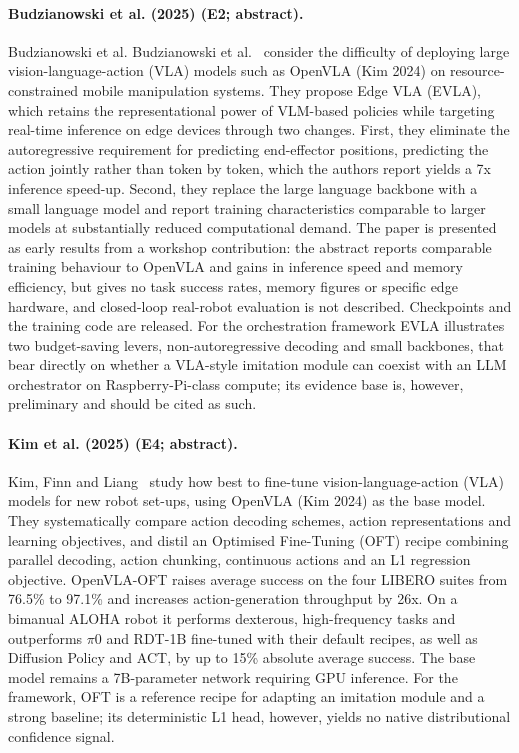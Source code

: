 \documentclass[10pt,a4paper]{article}
\begin{document}
\paragraph{Budzianowski et al. (2025) (E2; abstract).} Budzianowski et al. Budzianowski et al.~\cite{Budzianowski2025} consider the difficulty of deploying large vision-language-action (VLA) models such as OpenVLA (Kim 2024) on resource-constrained mobile manipulation systems. They propose Edge VLA (EVLA), which retains the representational power of VLM-based policies while targeting real-time inference on edge devices through two changes. First, they eliminate the autoregressive requirement for predicting end-effector positions, predicting the action jointly rather than token by token, which the authors report yields a 7x inference speed-up. Second, they replace the large language backbone with a small language model and report training characteristics comparable to larger models at substantially reduced computational demand. The paper is presented as early results from a workshop contribution: the abstract reports comparable training behaviour to OpenVLA and gains in inference speed and memory efficiency, but gives no task success rates, memory figures or specific edge hardware, and closed-loop real-robot evaluation is not described. Checkpoints and the training code are released. For the orchestration framework EVLA illustrates two budget-saving levers, non-autoregressive decoding and small backbones, that bear directly on whether a VLA-style imitation module can coexist with an LLM orchestrator on Raspberry-Pi-class compute; its evidence base is, however, preliminary and should be cited as such.

\paragraph{Kim et al. (2025) (E4; abstract).} Kim, Finn and Liang~\cite{Kim2025} study how best to fine-tune vision-language-action (VLA) models for new robot set-ups, using OpenVLA (Kim 2024) as the base model. They systematically compare action decoding schemes, action representations and learning objectives, and distil an Optimised Fine-Tuning (OFT) recipe combining parallel decoding, action chunking, continuous actions and an L1 regression objective. OpenVLA-OFT raises average success on the four LIBERO suites from 76.5\% to 97.1\% and increases action-generation throughput by 26x. On a bimanual ALOHA robot it performs dexterous, high-frequency tasks and outperforms $\pi$0 and RDT-1B fine-tuned with their default recipes, as well as Diffusion Policy and ACT, by up to 15\% absolute average success. The base model remains a 7B-parameter network requiring GPU inference. For the framework, OFT is a reference recipe for adapting an imitation module and a strong baseline; its deterministic L1 head, however, yields no native distributional confidence signal.
\end{document}
